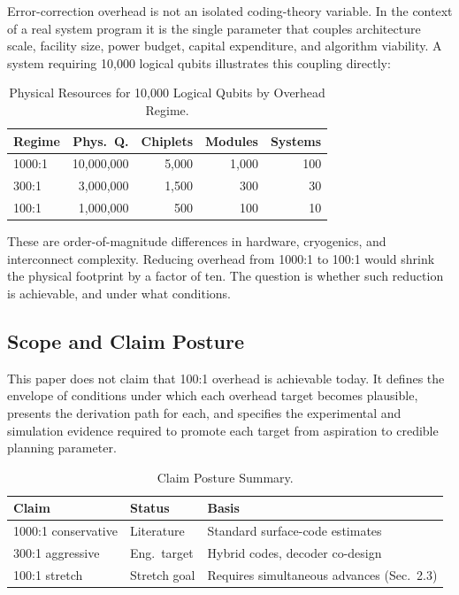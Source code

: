 \documentclass[conference]{IEEEtran}
\begin{document}
Error-correction overhead is not an isolated coding-theory variable. In the context of a real system program it is the single parameter that couples architecture scale, facility size, power budget, capital expenditure, and algorithm viability. A system requiring 10,000 logical qubits illustrates this coupling directly:

\begin{table}[htbp]
\centering
\caption{Physical Resources for 10,000 Logical Qubits by Overhead Regime.}
\label{tab:overhead_resources}
\begin{tabular}{lrrrr}
\toprule
\textbf{Regime} & \textbf{Phys.\ Q.} & \textbf{Chiplets} & \textbf{Modules} & \textbf{Systems} \\
\midrule
1000:1 & 10,000,000 & 5,000 & 1,000 & 100 \\
300:1 & 3,000,000 & 1,500 & 300 & 30 \\
100:1 & 1,000,000 & 500 & 100 & 10 \\
\bottomrule
\end{tabular}
\end{table}

These are order-of-magnitude differences in hardware, cryogenics, and interconnect complexity. Reducing overhead from 1000:1 to 100:1 would shrink the physical footprint by a factor of ten. The question is whether such reduction is achievable, and under what conditions.

\subsection{Scope and Claim Posture}

This paper does not claim that 100:1 overhead is achievable today. It defines the envelope of conditions under which each overhead target becomes plausible, presents the derivation path for each, and specifies the experimental and simulation evidence required to promote each target from aspiration to credible planning parameter.

\begin{table}[htbp]
\centering
\caption{Claim Posture Summary.}
\label{tab:claim_posture}
\begin{tabular}{llp{2.5cm}}
\toprule
\textbf{Claim} & \textbf{Status} & \textbf{Basis} \\
\midrule
1000:1 conservative & Literature & Standard surface-code estimates~\cite{fowler2012, dennis2002} \\
300:1 aggressive & Eng.\ target & Hybrid codes, decoder co-design \\
100:1 stretch & Stretch goal & Requires simultaneous advances (Sec.~2.3) \\
\bottomrule
\end{tabular}
\end{table}
\end{document}
